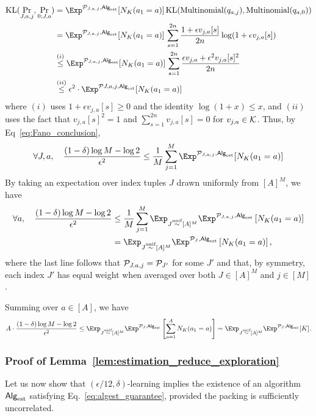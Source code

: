 \begin{align*}
\KL(\Pr_{J,a,j},\Pr_{0;J,a}) &= \Exp^{\calP_{J,a,j},\Algest}[N_K(a_1 = a)] \,\KL(\mathrm{Multinomial}(q_{a,j}),\mathrm{Multinomial}(q_{a,0} ))\\
&= \Exp^{\calP_{J,a,j},\Algest}[N_K(a_1 = a)] \,\sum_{s=1}^{2n} \frac{1 + \epsilon v_{j,a}[s]}{2n}\log(1 + \epsilon v_{j,a}[s])\\
&\overset{(i)}{\le} \Exp^{\calP_{J,a,j},\Algest}[N_K(a_1 = a)] \,\sum_{s=1}^{2n} \frac{\epsilon v_{j,a} + \epsilon^2 v_{j,a}[s]^2}{2n}\\
&\overset{(ii)}{\le} \epsilon^2 \cdot \Exp^{\calP{J,a,j},\Algest}[N_K(a_1 = a)] 
\end{align*}
where $(i)$ uses $1 + \epsilon v_{j,a}[s] \ge 0$ and the identity $\log (1+ x) \le x$, and $(ii)$ uses the fact that $v_{j,a}[s]^2 = 1$ and $\sum_{s = 1}^{2n} v_{j,a}[s] = 0$ for $v_{j,a} \in \mathcal{K}$.  Thus, by Eq~\ref{eq:Fano_conclusion},
\begin{align}\label{eq:Fano_conclusion}
\forall J,a, \quad \frac{(1 - \delta)\log M - \log 2}{\epsilon^2} \le  \frac{1}{M}\sum_{j=1}^M \Exp^{\calP_{J,a,j},\Algest}[N_K(a_1 = a)] 
\end{align}
By taking an expectation over index tuples $J$ drawn uniformly from $[A]^M$, we have 
\begin{align}\label{eq:Fano_conclusion}
\forall a, \quad \frac{(1 - \delta)\log M - \log 2}{\epsilon^2} &\le  \frac{1}{M}\sum_{j=1}^M \Exp_{J \unifsim [A]^{M}}\Exp^{\calP_{J,a,j},\Algest}\left[N_K(a_1 = a)\right]  \\
&= \Exp_{J \unifsim [A]^{M}}\Exp^{\calP_J,\Algest}\left[N_K(a_1 = a)\right],
\end{align}
where the last line follows that $\mathcal{P}_{J,a,j} = \mathcal{P}_{J'}$ for some $J'$ and that, by symmetry, each index $J'$ has equal weight when averaged over both $J \in [A]^M$ and $j \in [M]$.

Summing over $a \in [A]$, we have
\begin{align*}
A \cdot \frac{(1 - \delta)\log M - \log 2}{\epsilon^2} \le \Exp_{J \unifsim [A]^{M}}\Exp^{\calP_J,\Algest}\left[\sum_{a=1}^A N_K(a_1 = a)\right] = \Exp_{J \unifsim [A]^{M}}\Exp^{\calP_J,\Algest}[K].
\end{align*}

\subsubsection{Proof of Lemma~\ref{lem:estimation_reduce_exploration}}
Let us now show that $(\epsilon/12,\delta)$-learning implies the existence of an algorithm $\mathsf{Alg}_{\mathrm{est}}$ satisfying Eq.~\ref{eq:algest_guarantee}, provided the packing is sufficiently uncorrelated.

